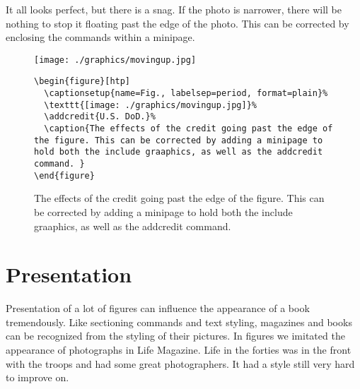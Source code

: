 It all looks perfect, but there is a snag. If the photo is narrower, there will be nothing to stop it floating past the edge of the photo. This can be corrected by enclosing the commands within a minipage.


\begin{figure}[htp]
\begin{commands}[]{}
%
\texttt{[image: ./graphics/movingup.jpg]}%
%
\caption{The effects of the credit going past the edge of the figure. This can be corrected by adding a minipage to hold both the include graaphics, as well as the addcredit command. }

\begin{verbatim}
\begin{figure}[htp]
  \captionsetup{name=Fig., labelsep=period, format=plain}%
  \texttt{[image: ./graphics/movingup.jpg]}%
  \addcredit{U.S. DoD.}%
  \caption{The effects of the credit going past the edge of the figure. This can be corrected by adding a minipage to hold both the include graaphics, as well as the addcredit command. }
\end{figure}
\end{verbatim}
\end{commands}
\end{figure}

\section{Presentation}

Presentation of a lot of figures can influence the appearance of a book tremendously. Like sectioning commands and text styling, magazines and books can be recognized from the styling of their pictures. In figures we imitated the appearance of photographs in Life Magazine. Life in the forties was in the front with the troops and had some great photographers.  It had a style still very hard to improve on.

